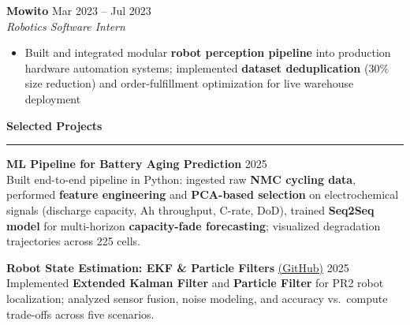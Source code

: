 \documentclass[9pt]{article}
\newcommand{\sect}[1]{\vspace{4pt}\noindent\textbf{\large #1}\vspace{3pt}\hrule\vspace{6pt}}
\begin{document}
\vspace{-1mm}
\textbf{Mowito} \hfill Mar 2023 -- Jul 2023\\
\emph{Robotics Software Intern}
\vspace{-2mm}
\begin{itemize}[leftmargin=*,noitemsep,topsep=1pt]
  \item Built and integrated modular \textbf{robot perception pipeline} into production hardware automation systems; implemented \textbf{dataset deduplication} (30\% size reduction) and order-fulfillment optimization for live warehouse deployment
\end{itemize}

\sect{Selected Projects}

\textbf{ML Pipeline for Battery Aging Prediction} \hfill 2025\\
Built end-to-end pipeline in Python: ingested raw \textbf{NMC cycling data}, performed \textbf{feature engineering} and \textbf{PCA-based selection} on electrochemical signals (discharge capacity, Ah throughput, C-rate, DoD), trained \textbf{Seq2Seq model} for multi-horizon \textbf{capacity-fade forecasting}; visualized degradation trajectories across 225 cells.

\textbf{Robot State Estimation: EKF \& Particle Filters} \href{https://github.com/Thiruloksundar/robot_state_estimation}{(GitHub)} \hfill 2025\\
Implemented \textbf{Extended Kalman Filter} and \textbf{Particle Filter} for PR2 robot localization; analyzed sensor fusion, noise modeling, and accuracy vs.\ compute trade-offs across five scenarios.
\end{document}
